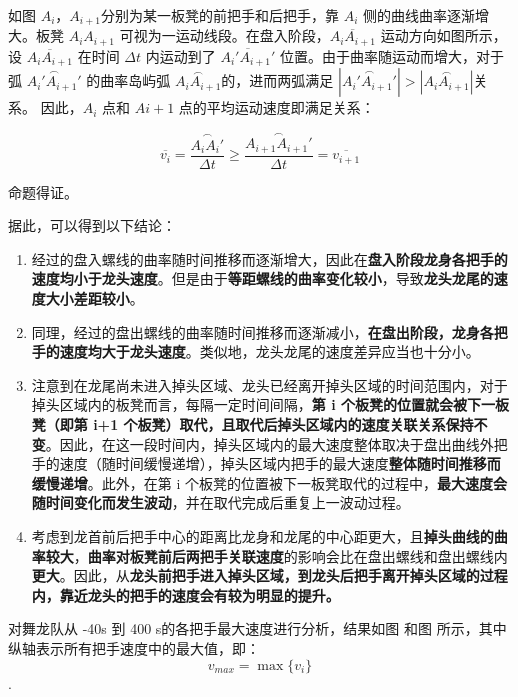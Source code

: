 \documentclass[a4paper]{article}
\begin{document}
		如图%
		$A_i$，$A_{i+1}$分别为某一板凳的前把手和后把手，靠 $A_i$ 侧的曲线曲率逐渐增大。板凳 $A_iA_{i+1}$ 可视为一运动线段。在盘入阶段，$\overline{A_iA_{i+1}}$ 运动方向如图所示，设 $\overline{A_iA_{i+1}}$ 在时间 $\Delta t$ 内运动到了 $\overline{A_i'A_{i+1}'}$ 位置。由于曲率随运动而增大，对于弧 $\overset{\frown}{A_i'A_{i+1}'}$ 的曲率岛屿弧 $ \overset{\frown}{A_iA_{i+1}} $的，进而两弧满足 $|\overset{\frown}{A_i'A_{i+1}'}| > |\overset{\frown}{A_iA_{i+1}}| $关系。 因此，$A_i$ 点和 $A{i+1}$ 点的平均运动速度即满足关系：
		
		\begin{equation}
			\overline{v_{i}} = \frac{\overset{\frown}{A_iA_i'}}{\Delta t} \ge
			\frac{\overset{\frown}{A_{i+1}A_{i+1}'}}{\Delta t} = \overline{v_{i+1}}
		\end{equation}
		
		命题得证。
		
		据此，可以得到以下结论：
		\begin{enumerate}
			\item 经过的盘入螺线的曲率随时间推移而逐渐增大，因此在\textbf{盘入阶段龙身各把手的速度均小于龙头速度}。但是由于\textbf{等距螺线的曲率变化较小}，导致\textbf{龙头龙尾的速度大小差距较小}。
			
			\item 同理，经过的盘出螺线的曲率随时间推移而逐渐减小，\textbf{在盘出阶段，龙身各把手的速度均大于龙头速度}。类似地，龙头龙尾的速度差异应当也十分小。
			
			\item 注意到在龙尾尚未进入掉头区域、龙头已经离开掉头区域的时间范围内，对于掉头区域内的板凳而言，每隔一定时间间隔，\textbf{第 i 个板凳的位置就会被下一板凳（即第 i+1 个板凳）取代，且取代后掉头区域内的速度关联关系保持不变}。因此，在这一段时间内，掉头区域内的最大速度整体取决于盘出曲线外把手的速度（随时间缓慢递增），掉头区域内把手的最大速度\textbf{整体随时间推移而缓慢递增}。此外，在第 i 个板凳的位置被下一板凳取代的过程中，\textbf{最大速度会随时间变化而发生波动}，并在取代完成后重复上一波动过程。
			
			\item 考虑到龙首前后把手中心的距离比龙身和龙尾的中心距更大，且\textbf{掉头曲线的曲率较大}，\textbf{曲率对板凳前后两把手关联速度}的影响会比在盘出螺线和盘出螺线内\textbf{更大}。因此，从\textbf{龙头前把手进入掉头区域，到龙头后把手离开掉头区域的过程内，靠近龙头的把手的速度会有较为明显的提升。}
		\end{enumerate}
		
		对舞龙队从 -40s 到 400 s的各把手最大速度进行分析，结果如图 %
		和图%
		所示，其中纵轴表示所有把手速度中的最大值，即：
		$$v_{max} = \max\{{v_i}\}$$.
		
\end{document}

